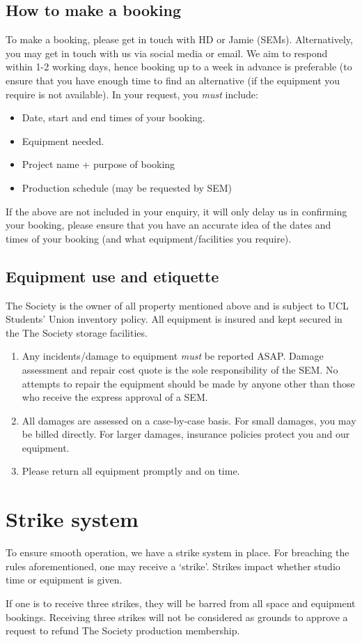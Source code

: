 \documentclass[]{article}
\begin{document}
\subsection{How to make a booking}
To make a booking, please get in touch with HD or Jamie (SEMs). Alternatively, you may get in touch with us via social media or email. We aim to respond within 1-2 working days, hence booking up to a week in advance is preferable (to ensure that you have enough time to find an alternative (if the equipment you require is not available). In your request, you \textit{must} include:
\begin{itemize}
    \item Date, start and end times of your booking.
    \item Equipment needed.
    \item Project name + purpose of booking
    \item Production schedule (may be requested by SEM)
\end{itemize}
If the above are not included in your enquiry, it will only delay us in confirming your booking, please ensure that you have an accurate idea of the dates and times of your booking (and what equipment/facilities you require).
\subsection{Equipment use and etiquette}
The Society is the owner of all property mentioned above and is subject to UCL Students' Union inventory policy. All equipment is insured and kept secured in the The Society storage facilities.
\begin{enumerate}
    \item Any incidents/damage to equipment \textit{must} be reported ASAP. Damage assessment and repair cost quote is the sole responsibility of the SEM. No attempts to repair the equipment should be made by anyone other than those who receive the express approval of a SEM.
    \item All damages are assessed on a case-by-case basis. For small damages, you may be billed directly. For larger damages, insurance policies protect you and our equipment.
    \item Please return all equipment promptly and on time.
\end{enumerate}
\section{Strike system}\label{strikeSystem}
To ensure smooth operation, we have a strike system in place. For breaching the rules aforementioned, one may receive a `strike'. Strikes impact whether studio time or equipment is given.

If one is to receive three strikes, they will be barred from all space and equipment bookings. Receiving three strikes will not be considered as grounds to approve a request to refund The Society production membership.
\end{document}
